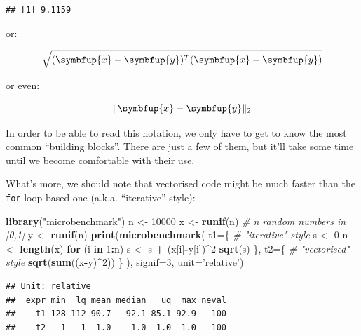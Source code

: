\documentclass[10pt,b5paper,krantz1]{krantz}
\newenvironment{Shaded}{\begin{snugshade}}{\end{snugshade}}
\newcommand{\CommentTok}[1]{\textcolor[rgb]{0.37,0.37,0.37}{\textit{#1}}}
\newcommand{\ControlFlowTok}[1]{\textcolor[rgb]{0.27,0.27,0.27}{\textbf{#1}}}
\newcommand{\DataTypeTok}[1]{\textcolor[rgb]{0.27,0.27,0.27}{#1}}
\newcommand{\DecValTok}[1]{\textcolor[rgb]{0.06,0.06,0.06}{#1}}
\newcommand{\KeywordTok}[1]{\textcolor[rgb]{0.27,0.27,0.27}{\textbf{#1}}}
\newcommand{\NormalTok}[1]{#1}
\newcommand{\OperatorTok}[1]{\textcolor[rgb]{0.43,0.43,0.43}{\textbf{#1}}}
\newcommand{\StringTok}[1]{\textcolor[rgb]{0.5,0.5,0.5}{#1}}
\renewcommand{\boldsymbol}[1]{\symbfup{#1}}
\begin{document}
\begin{verbatim}
## [1] 9.1159
\end{verbatim}

or:

\[
\sqrt{(\boldsymbol{x}-\boldsymbol{y})^{T}(\boldsymbol{x}-\boldsymbol{y})}
\]

or even:

\[
\|\boldsymbol{x}-\boldsymbol{y}\|_2
\]

In order to be able to read this notation,
we only have to get to know the most common ``building blocks''.
There are just a few of them, but it'll take some time until we become comfortable
with their use.

What's more, we should note that vectorised code might be
much faster than the \texttt{for} loop-based one (a.k.a. ``iterative'' style):

\begin{Shaded}
\begin{Highlighting}[]
\KeywordTok{library}\NormalTok{(}\StringTok{"microbenchmark"}\NormalTok{)}
\NormalTok{n <-}\StringTok{ }\DecValTok{10000}
\NormalTok{x <-}\StringTok{ }\KeywordTok{runif}\NormalTok{(n) }\CommentTok{# n random numbers in [0,1]}
\NormalTok{y <-}\StringTok{ }\KeywordTok{runif}\NormalTok{(n)}
\KeywordTok{print}\NormalTok{(}\KeywordTok{microbenchmark}\NormalTok{(}
    \DataTypeTok{t1=}\NormalTok{\{}
        \CommentTok{# "iterative" style}
\NormalTok{        s <-}\StringTok{ }\DecValTok{0}
\NormalTok{        n <-}\StringTok{ }\KeywordTok{length}\NormalTok{(x)}
        \ControlFlowTok{for}\NormalTok{ (i }\ControlFlowTok{in} \DecValTok{1}\OperatorTok{:}\NormalTok{n)}
\NormalTok{            s <-}\StringTok{ }\NormalTok{s }\OperatorTok{+}\StringTok{ }\NormalTok{(x[i]}\OperatorTok{-}\NormalTok{y[i])}\OperatorTok{^}\DecValTok{2}
        \KeywordTok{sqrt}\NormalTok{(s)}
\NormalTok{    \},}
    \DataTypeTok{t2=}\NormalTok{\{}
        \CommentTok{# "vectorised" style}
        \KeywordTok{sqrt}\NormalTok{(}\KeywordTok{sum}\NormalTok{((x}\OperatorTok{-}\NormalTok{y)}\OperatorTok{^}\DecValTok{2}\NormalTok{))}
\NormalTok{    \}}
\NormalTok{), }\DataTypeTok{signif=}\DecValTok{3}\NormalTok{, }\DataTypeTok{unit=}\StringTok{'relative'}\NormalTok{)}
\end{Highlighting}
\end{Shaded}

\begin{verbatim}
## Unit: relative
##  expr min  lq mean median   uq  max neval
##    t1 128 112 90.7   92.1 85.1 92.9   100
##    t2   1   1  1.0    1.0  1.0  1.0   100
\end{verbatim}
\end{document}
